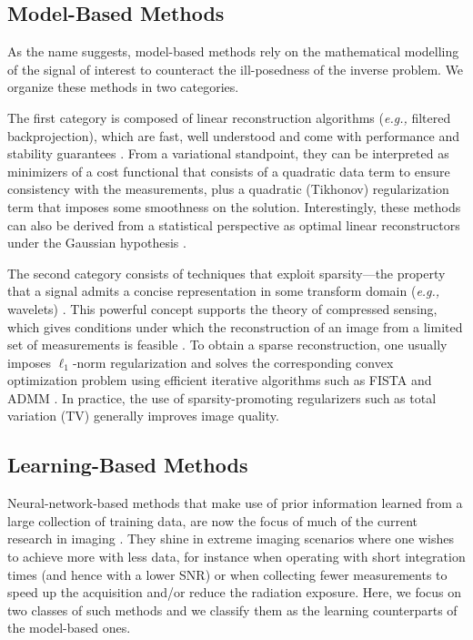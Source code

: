 \documentclass[journal]{IEEEtran}
\begin{document}
\subsection{Model-Based Methods}
As the name suggests, model-based methods rely on the mathematical modelling of the signal of interest to counteract the ill-posedness of the inverse problem. We organize these methods in two categories.

The first category is composed of linear reconstruction algorithms (\textit{e.g.,} filtered backprojection), which are fast, well understood and come with performance and stability guarantees \cite{tikhonov1963, bertero1998}. From a variational standpoint, they can be interpreted as minimizers of a cost functional that consists of a quadratic data term to ensure consistency with the measurements, plus a quadratic (Tikhonov) regularization term that imposes some smoothness on the solution. Interestingly, these methods can also be derived from a statistical perspective as optimal linear reconstructors under the Gaussian hypothesis \cite{kay1993fundamentals}.

The second category consists of techniques that exploit sparsity---the property that a signal admits a concise representation in some transform domain (\textit{e.g.,} wavelets) \cite{mallat1999wavelet, bruckstein2009sparse,baraniuk2010applications,elad2010sparse}. This powerful concept supports the theory of compressed sensing, which gives conditions under which the reconstruction of an image from a limited set of measurements is feasible \cite{donoho2006compressed,candes2008introduction,foucart2013invitation}. To obtain a sparse reconstruction, one usually imposes $\ell_1$-norm regularization and solves the corresponding convex optimization problem using efficient iterative algorithms such as FISTA \cite{beck2009fast} and ADMM \cite{boyd2011distributed}. In practice, the use of sparsity-promoting regularizers such as total variation (TV) \cite{rudin1992nonlinear} generally improves image quality.

\subsection{Learning-Based Methods}
Neural-network-based methods that make use of prior information learned from a large collection of training data, are now the focus of much of the current research in imaging \cite{mccann2017convolutional,ongie2020deep}. They shine in extreme imaging scenarios where one wishes to achieve more with less data, for instance when operating with short integration times (and hence with a lower SNR) or when collecting fewer measurements to speed up the acquisition and/or reduce the radiation exposure. Here, we focus on two classes of such methods and we classify them as the learning counterparts of the model-based ones.
\end{document}
